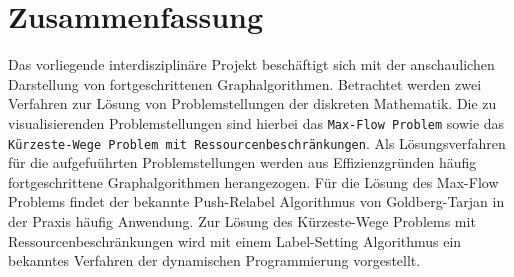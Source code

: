 %
%
%
%

\section*{Zusammenfassung}
Das vorliegende interdisziplin\"are Projekt besch\"aftigt sich mit der anschaulichen Darstellung von fortgeschrittenen Graphalgorithmen. Betrachtet werden zwei Verfahren zur L\"osung von Problemstellungen der diskreten Mathematik. Die zu visualisierenden Problemstellungen sind hierbei das \texttt{Max-Flow Problem} sowie das \texttt{K\"urzeste-Wege Problem mit Ressourcenbeschr\"ankungen}. Als L\"osungsverfahren f\"ur die aufgefu\"uhrten Problemstellungen werden aus Effizienzgr\"unden h\"aufig fortgeschrittene Graphalgorithmen herangezogen. F\"ur die L\"osung des Max-Flow Problems findet der bekannte Push-Relabel Algorithmus von Goldberg-Tarjan in der Praxis h\"aufig Anwendung. Zur L\"osung des K\"urzeste-Wege Problems mit Ressourcenbeschr\"ankungen wird mit einem Label-Setting Algorithmus ein bekanntes Verfahren der dynamischen Programmierung vorgestellt.


